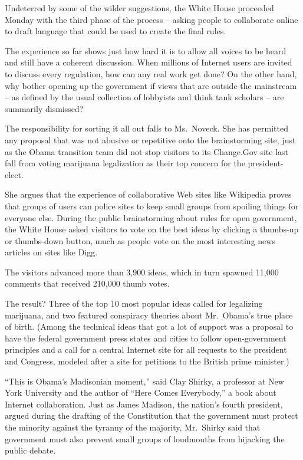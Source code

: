 ﻿\documentclass[12pt]{article}
\begin{document}
Undeterred by some of the wilder suggestions, the White House proceeded Monday with the third phase
of the process -- asking people to collaborate online to draft language that could be used to create
the final rules.

The experience so far shows just how hard it is to allow all voices to be heard and still have a
coherent discussion. When millions of Internet users are invited to discuss every regulation, how
can any real work get done? On the other hand, why bother opening up the government if views that
are outside the mainstream -- as defined by the usual collection of lobbyists and think tank
scholars -- are summarily dismissed?

The responsibility for sorting it all out falls to Ms.~Noveck. She has permitted any proposal that
was not abusive or repetitive onto the brainstorming site, just as the Obama transition team did not
stop visitors to its Change.Gov site last fall from voting marijuana legalization as their top
concern for the president-elect.

She argues that the experience of collaborative Web sites like Wikipedia proves that groups of users
can police sites to keep small groups from spoiling things for everyone else. During the public
brainstorming about rules for open government, the White House asked visitors to vote on the best
ideas by clicking a thumbs-up or thumbs-down button, much as people vote on the most interesting
news articles on sites like Digg.

The visitors advanced more than 3,900 ideas, which in turn spawned 11,000 comments that received
210,000 thumb votes.

The result? Three of the top 10 most popular ideas called for legalizing marijuana, and two featured
conspiracy theories about Mr.~Obama's true place of birth. (Among the technical ideas that got a lot
of support was a proposal to have the federal government press states and cities to follow
open-government principles and a call for a central Internet site for all requests to the president
and Congress, modeled after a site for petitions to the British prime minister.)

``This is Obama's Madisonian moment,'' said Clay Shirky, a professor at New York University and the
author of ``Here Comes Everybody,'' a book about Internet collaboration. Just as James Madison, the
nation's fourth president, argued during the drafting of the Constitution that the government must
protect the minority against the tyranny of the majority, Mr.~Shirky said that government must also
prevent small groups of loudmouths from hijacking the public debate.
\end{document}
